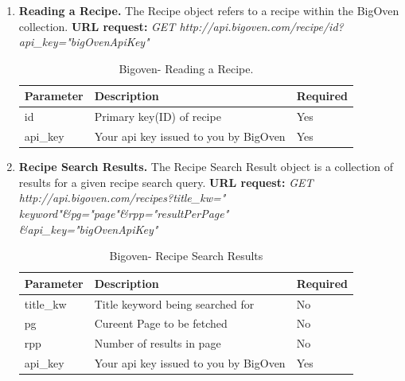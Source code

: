 \begin{enumerate}
	\item \textbf{Reading a Recipe.}\newline \newline
	The Recipe object refers to a recipe within the BigOven collection.\newline \newline
	\textbf{URL request:}\newline 
	\textit{GET http://api.bigoven.com/recipe/{id}?api\_key="bigOvenApiKey"}
	\newline 
	\begin{table}[ht]
		\centering %
		\begin{tabular}{p{3cm} p{6cm} p{3cm}}  %
			\hline\hline %
			Parameter & Description & Required \\ %
			\hline %
			id & Primary key(ID) of recipe & Yes \\ 
			api\_key & Your api key issued to you by BigOven & Yes \\ 
			\hline %
		\end{tabular}
		\caption{Bigoven- Reading a Recipe.}
		\label{table:bigoven-reading-recipe}
	\end{table}
	
	\item \textbf{Recipe Search Results.}\newline \newline
	The Recipe Search Result object is a collection of results for a given recipe search query.\newline \newline
	\textbf{URL request:}\newline
	\textit{GET http://api.bigoven.com/recipes?title\_kw=" keyword"\&pg="page"\&rpp="resultPerPage"\\
	\&api\_key="bigOvenApiKey"	} \newline 
	
	\begin{table}[ht]
		\centering %
		\begin{tabular}{p{3cm} p{6cm} p{3cm}}  %
			\hline\hline %
			Parameter & Description & Required \\ %
			\hline %
			title\_kw & Title keyword being searched for & No \\ 
			pg & Cureent Page to be fetched & No \\ 
			rpp & Number of results in page & No \\ 
			api\_key & Your api key issued to you by BigOven & Yes \\ 
			\hline %
		\end{tabular}
		\caption{Bigoven-  Recipe Search Results}
		\label{table:bigoven-recipe-search-results}
	\end{table}

\end{enumerate}

